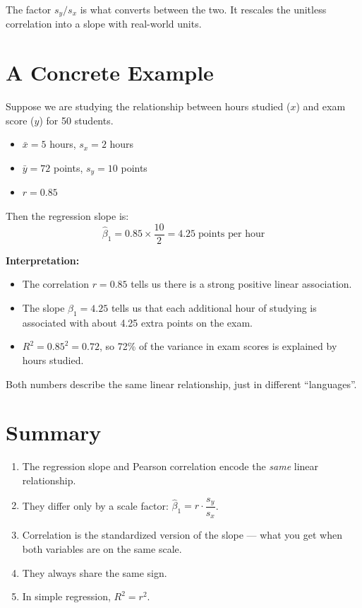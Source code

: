 \documentclass[11pt,a4paper]{article}
\begin{document}
The factor $s_y / s_x$ is what converts between the two. It rescales the
unitless correlation into a slope with real-world units.

\section{A Concrete Example}

Suppose we are studying the relationship between hours studied ($x$) and exam
score ($y$) for 50 students.

\begin{itemize}[nosep]
  \item $\bar{x} = 5$ hours, \quad $s_x = 2$ hours
  \item $\bar{y} = 72$ points, \quad $s_y = 10$ points
  \item $r = 0.85$
\end{itemize}

Then the regression slope is:
\[
\hat{\beta}_1 = 0.85 \times \frac{10}{2} = 4.25 \;\text{points per hour}
\]

\textbf{Interpretation:}
\begin{itemize}[nosep]
  \item The correlation $r = 0.85$ tells us there is a strong positive linear
        association.
  \item The slope $\hat{\beta}_1 = 4.25$ tells us that each additional hour of
        studying is associated with about 4.25 extra points on the exam.
  \item $R^2 = 0.85^2 = 0.72$, so 72\% of the variance in exam scores is
        explained by hours studied.
\end{itemize}

Both numbers describe the same linear relationship, just in different
``languages''.

\section{Summary}

\begin{enumerate}
  \item The regression slope and Pearson correlation encode the \emph{same}
        linear relationship.
  \item They differ only by a scale factor: \;
        $\hat{\beta}_1 = r \cdot \dfrac{s_y}{s_x}$.
  \item Correlation is the standardized version of the slope --- what you get
        when both variables are on the same scale.
  \item They always share the same sign.
  \item In simple regression, $R^2 = r^2$.
\end{enumerate}
\end{document}
